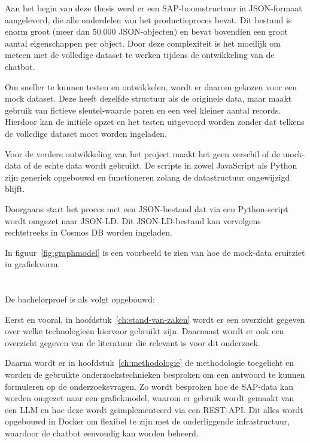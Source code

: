 Aan het begin van deze thesis werd er een SAP-boomstructuur in JSON-formaat aangeleverd, die alle onderdelen van het productieproces bevat.
Dit bestand is enorm groot (meer dan 50.000 JSON-objecten) en bevat bovendien een groot aantal eigenschappen per object.
Door deze complexiteit is het moeilijk om meteen met de volledige dataset te werken tijdens de ontwikkeling van de chatbot.

Om sneller te kunnen testen en ontwikkelen, wordt er daarom gekozen voor een mock dataset.
Deze heeft dezelfde structuur als de originele data, maar maakt gebruik van fictieve sleutel-waarde paren en een veel kleiner aantal records.
Hierdoor kan de initiële opzet en het testen uitgevoerd worden zonder dat telkens de volledige dataset moet worden ingeladen.

Voor de verdere ontwikkeling van het project maakt het geen verschil of de mock-data of de echte data wordt gebruikt.
De scripts in zowel JavaScript als Python zijn generiek opgebouwd en functioneren zolang de datastructuur ongewijzigd blijft.

Doorgaans start het proces met een JSON-bestand dat via een Python-script wordt omgezet naar JSON-LD.\@
Dit JSON-LD-bestand kan vervolgens rechtstreeks in Cosmos DB worden ingeladen.

In figuur~\ref{fig:graphmodel} is een voorbeeld te zien van hoe de mock-data eruitziet in grafiekvorm.

\section{}%
\label{sec:opzet-bachelorproef}

De bachelorproef is als volgt opgebouwd:

Eerst en vooral, in hoofdstuk~\ref{ch:stand-van-zaken} wordt er een overzicht gegeven over welke technologieën hiervoor gebruikt zijn.
Daarnaast wordt er ook een overzicht gegeven van de literatuur die relevant is voor dit onderzoek.

Daarna wordt er in hoofdstuk~\ref{ch:methodologie} de methodologie toegelicht en worden de gebruikte onderzoekstechnieken besproken om een antwoord te kunnen formuleren op de onderzoeksvragen.
Zo wordt besproken hoe de SAP-data kan worden omgezet naar een grafiekmodel, waarom er gebruik wordt gemaakt van een LLM en hoe deze wordt geïmplementeerd via een REST-API.\@
Dit alles wordt opgebouwd in Docker om flexibel te zijn met de onderliggende infrastructuur, waardoor de chatbot eenvoudig kan worden beheerd.


